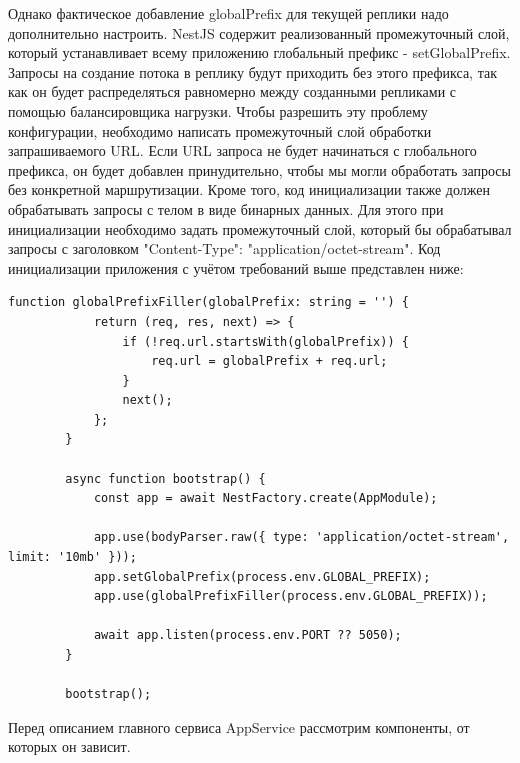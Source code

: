 	Однако фактическое добавление globalPrefix для текущей реплики надо дополнительно настроить. NestJS содержит реализованный промежуточный слой, который устанавливает всему приложению глобальный префикс - setGlobalPrefix. Запросы на создание потока в реплику будут приходить без этого префикса, так как он будет распределяться равномерно между созданными репликами с помощью балансировщика нагрузки. Чтобы разрешить эту проблему конфигурации, необходимо написать промежуточный слой обработки запрашиваемого URL. Если URL запроса не будет начинаться с глобального префикса, он будет добавлен принудительно, чтобы мы могли обработать запросы без конкретной маршрутизации. Кроме того, код инициализации также должен обрабатывать запросы с телом в виде бинарных данных. Для этого при инициализации необходимо задать промежуточный слой, который бы обрабатывал запросы с заголовком "Content-Type": "application/octet-stream". Код инициализации приложения с учётом требований выше представлен ниже:

	\begin{lstlisting}[caption=Код старта сервиса-траскодировщика]
		function globalPrefixFiller(globalPrefix: string = '') {
			return (req, res, next) => {
				if (!req.url.startsWith(globalPrefix)) {
					req.url = globalPrefix + req.url;
				}
				next();
			};
		}
		
		async function bootstrap() {
			const app = await NestFactory.create(AppModule);
			
			app.use(bodyParser.raw({ type: 'application/octet-stream', limit: '10mb' }));
			app.setGlobalPrefix(process.env.GLOBAL_PREFIX);
			app.use(globalPrefixFiller(process.env.GLOBAL_PREFIX));
			
			await app.listen(process.env.PORT ?? 5050);
		}
		
		bootstrap();
	\end{lstlisting}

	Перед описанием главного сервиса AppService рассмотрим компоненты, от которых он зависит.

